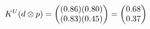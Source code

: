 \documentclass[preview]{standalone}
\begin{document}
\begin{align*}
\special{dvisvgm:raw <g id='unique000'>}K^U(d \otimes p) = \begin{pmatrix} (0.86)(0.80) \\ (0.83)(0.45) \end{pmatrix} = \begin{pmatrix} 0.68 \\ 0.37 \end{pmatrix}\special{dvisvgm:raw </g>}
\end{align*}
\end{document}
